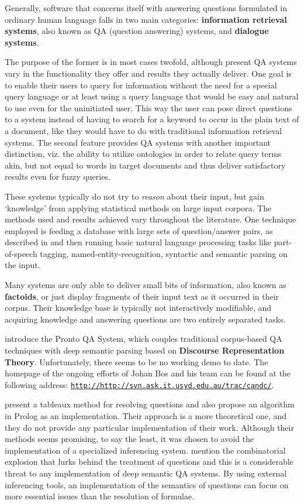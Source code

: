 \documentclass[a4paper]{article}
\newcommand{\abbr}{\textsf} %
\newcommand{\term}[1]{\textsf{\textbf{#1}}} %
\newcommand{\code}[1]{\texttt{#1}} %
\newcommand{\pn}{\textsf} %
\newcommand{\url}[1]{\code{http://#1}} %
\newcommand{\prol}{\pn{Prolog}}
\theoremstyle{remark}
\theoremstyle{remark}
\theoremstyle{definition}
\theoremstyle{definition}
\begin{document}
Generally, software that concerns itself with answering questions formulated in
ordinary human language falls in two main categories: \term{information
retrieval systems}, also known as \abbr{QA} (question answering) systems, and
\term{dialogue systems}.

The purpose of the former is in most cases twofold, although present
\abbr{QA} systems vary in the functionality they offer
and results they actually deliver. One goal is to enable their users to
query for information without the need for a special query language or at least
using a query language that would be easy and natural to use even for the
uninitiated user. This way the user can pose direct questions to a system
instead of having to search for a keyword to occur in the plain text of a
document, like they would have to do with traditional information
retrieval systems. The second feature provides \abbr{QA} systems with another important
distinction, viz. the ability to utilize ontologies in order to relate query
terms akin, but not equal to words in target documents and thus deliver
satisfactory results even for fuzzy queries.

These systems typically do not try to \emph{reason} about
their input, but gain `knowledge' from applying statistical methods on large
input corpora. The methods used and results achieved vary throughout the
literature. One technique employed is feeding a database with large sets of
question/answer pairs, as described in \cite{rama} and then running basic
natural language processing tasks like part-of-speech tagging,
named-entity-recognition, syntactic and semantic parsing on the input.

Many systems are only able to deliver small bits of information, also known as
\term{factoids}, or just display fragments of their input text as it occurred in
their corpus. Their knowledge base is typically not interactively modifiable,
and acquiring knowledge and answering questions are two entirely separated
tasks.

\cite{prontoqa} introduce the \pn{Pronto QA System}, which couples traditional
corpus-based \abbr{QA} techniques with deep semantic parsing based on
\term{Discourse Representation Theory}. Unfortunately, there seems
to be no working demo to date. The homepage of the ongoing efforts of Johan Bos
and his team can be found at the following address:
\href{http://svn.ask.it.usyd.edu.au/trac/candc/}{\url{http://svn.ask.it.usyd.edu.au/trac/candc/}}.

\cite{tenCate} present a tableaux method for resolving questions and also
propose an algorithm in \prol{} as an implementation. Their approach is a more
theoretical one, and they do not provide any particular implementation of their
work. Although their methods seems promising, to say the least, it was chosen to
avoid the implementation of a specialized inferencing system. \cite{bosgabdsil}
mention the combinatorial explosion that lurks behind the treatment of questions
and this is a considerable threat to any implementation of deep semantic
\abbr{QA} systems. By using external inferencing tools, an implementation of
the semantics of questions can focus on more essential issues than the
resolution of formulae. %
\end{document}

